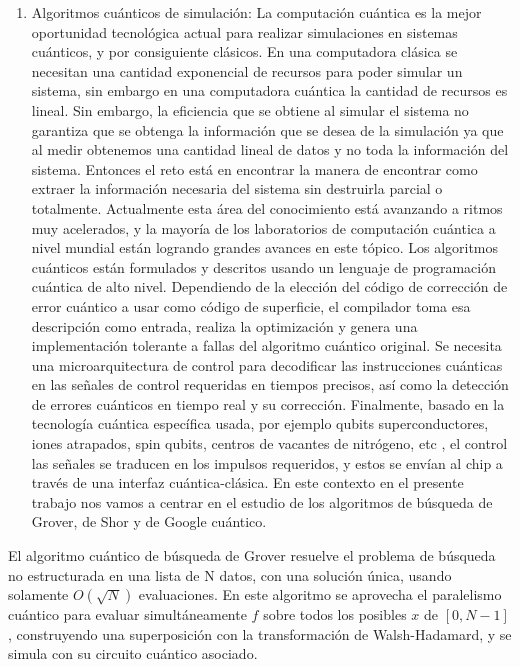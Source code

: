 \begin{enumerate}
    \item Algoritmos cuánticos de simulación: La computación cuántica es la mejor oportunidad tecnológica actual para realizar simulaciones en sistemas cuánticos, y por consiguiente clásicos. En una computadora clásica se necesitan una cantidad exponencial de recursos para poder simular un sistema, sin embargo en una computadora cuántica la cantidad de recursos es lineal. Sin embargo, la eficiencia que se obtiene al simular el sistema no garantiza que se obtenga la información que se desea de la simulación ya que al medir obtenemos una cantidad lineal de datos y no toda la información del sistema. Entonces el reto está en encontrar la manera de encontrar como extraer la información necesaria del sistema sin destruirla parcial o totalmente. Actualmente esta área del conocimiento está avanzando a ritmos muy acelerados, y la mayoría de los laboratorios de computación cuántica a nivel mundial están logrando grandes avances en este tópico.  Los algoritmos cuánticos están formulados y descritos usando un lenguaje de programación cuántica de alto nivel. Dependiendo de la elección del código de corrección de error cuántico a usar como código de superficie, el compilador toma esa descripción como entrada, realiza la optimización y genera una implementación tolerante a fallas del algoritmo cuántico original. Se necesita una microarquitectura de control para decodificar las instrucciones cuánticas en las señales de control requeridas en tiempos precisos, así como la detección de errores cuánticos en tiempo real y su corrección. Finalmente, basado en la tecnología cuántica específica usada, por ejemplo qubits superconductores, iones atrapados, spin qubits, centros de vacantes de nitrógeno, etc \cite{Nakahara_2008}, el control las señales se traducen en los impulsos requeridos, y estos se envían al chip a través de una interfaz cuántica-clásica.  En este contexto en el presente trabajo nos vamos a centrar en el estudio de los algoritmos de búsqueda de Grover, de Shor y de Google cuántico.
\end{enumerate}

El algoritmo cuántico de búsqueda de Grover resuelve el problema de búsqueda no estructurada en una lista de N datos, con una solución única, usando solamente $O(\sqrt{N})$ evaluaciones. En este algoritmo se aprovecha el paralelismo cuántico para evaluar simultáneamente $f$ sobre todos los posibles $x$ de $[0,N-1]$, construyendo una superposición con la transformación de Walsh-Hadamard, y se simula con su circuito cuántico asociado.


